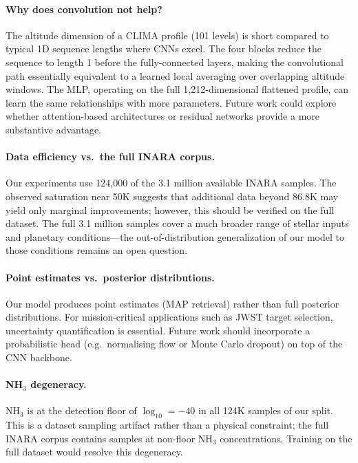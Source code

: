 \documentclass[11pt]{article}
\begin{document}
\paragraph{Why does convolution not help?}
The altitude dimension of a CLIMA profile (101 levels) is short compared to
typical 1D sequence lengths where CNNs excel. The four blocks reduce the
sequence to length 1 before the fully-connected layers, making the convolutional
path essentially equivalent to a learned local averaging over overlapping
altitude windows. The MLP, operating on the full 1{,}212-dimensional flattened
profile, can learn the same relationships with more parameters. Future work
could explore whether attention-based architectures or residual networks
provide a more substantive advantage.

\paragraph{Data efficiency vs.\ the full INARA corpus.}
Our experiments use 124{,}000 of the 3.1 million available INARA samples.
The observed saturation near 50K suggests that additional data beyond 86.8K
may yield only marginal improvements; however, this should be verified on the
full dataset. The full 3.1 million samples cover a much broader range of
stellar inputs and planetary conditions—the out-of-distribution generalization
of our model to those conditions remains an open question.

\paragraph{Point estimates vs.\ posterior distributions.}
Our model produces point estimates (MAP retrieval) rather than full posterior
distributions. For mission-critical applications such as JWST target selection,
uncertainty quantification is essential. Future work should incorporate a
probabilistic head (e.g.\ normalising flow \citep{vasist2023} or Monte Carlo
dropout) on top of the CNN backbone.

\paragraph{NH\texorpdfstring{$_3$}{3} degeneracy.}
NH$_3$ is at the detection floor of $\log_{10} = -40$ in all 124K samples of
our split. This is a dataset sampling artifact rather than a physical
constraint; the full INARA corpus contains samples at non-floor NH$_3$
concentrations. Training on the full dataset would resolve this degeneracy.
\end{document}
